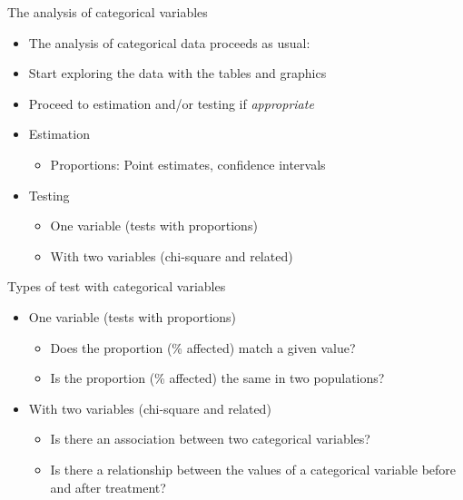 \documentclass[
  ignorenonframetext,
]{beamer}
\providecommand{\tightlist}{%
  \setlength{\itemsep}{0pt}\setlength{\parskip}{0pt}}
\begin{document}
\begin{frame}{The analysis of categorical variables}
\protect\hypertarget{the-analysis-of-categorical-variables}{}
\begin{itemize}
\item
  The analysis of categorical data proceeds as usual:
\item
  Start exploring the data with the tables and graphics
\item
  Proceed to estimation and/or testing if \emph{appropriate}
\item
  Estimation

  \begin{itemize}
  \tightlist
  \item
    Proportions: Point estimates, confidence intervals
  \end{itemize}
\item
  Testing

  \begin{itemize}
  \tightlist
  \item
    One variable (tests with proportions)
  \item
    With two variables (chi-square and related)
  \end{itemize}
\end{itemize}
\end{frame}

\begin{frame}{Types of test with categorical variables}
\protect\hypertarget{types-of-test-with-categorical-variables}{}
\begin{itemize}
\item
  One variable (tests with proportions)

  \begin{itemize}
  \tightlist
  \item
    Does the proportion (\% affected) match a given value?
  \item
    Is the proportion (\% affected) the same in two populations?
  \end{itemize}
\item
  With two variables (chi-square and related)

  \begin{itemize}
  \tightlist
  \item
    Is there an association between two categorical variables?
  \item
    Is there a relationship between the values of a categorical variable
    before and after treatment?
  \end{itemize}
\end{itemize}
\end{frame}
\end{document}
